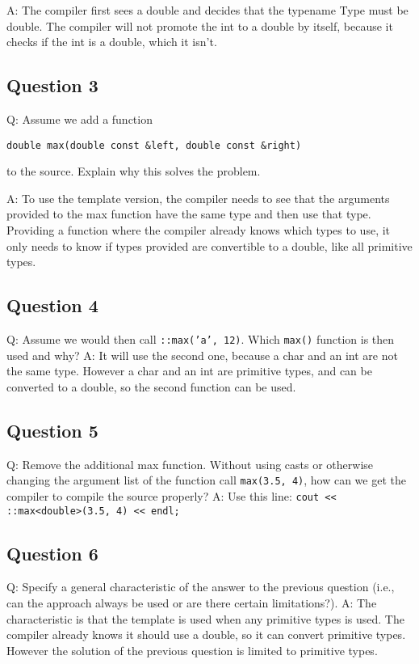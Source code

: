 \documentclass[11pt]{article}
\begin{document}
A: The compiler first sees a double and decides that the typename Type must be double.
The compiler will not promote the int to a double by itself, because it checks if the int is a double, which it isn't.

\subsection*{Question 3}
Q: Assume we add a function
\begin{lstlisting}
double max(double const &left, double const &right)
\end{lstlisting}
to the source. Explain why this solves the problem.

A: To use the template version, the compiler needs to see that the arguments provided to the max function have the same type and then use that type. Providing a function where the compiler already knows which types to use, it only needs to know if types provided are convertible to a double, like all primitive types.

\subsection*{Question 4}
Q: Assume we would then call \texttt{::max('a', 12)}. Which \texttt{max()} function is then used and why?
A: It will use the second one, because a char and an int are not the same type. However a char and an int are primitive types, and can be converted to a double, so the second function can be used.

\subsection*{Question 5}
Q: Remove the additional max function. Without using casts or otherwise changing the argument list of the function call \texttt{max(3.5, 4)}, how can we get the compiler to compile the source properly?
A: Use this line: \texttt{cout << ::max<double>(3.5, 4) << endl;}



\subsection*{Question 6}
Q: Specify a general characteristic of the answer to the previous question (i.e., can the approach always be used or are there certain limitations?).
A: The characteristic is that the template is used when any primitive types is used. The compiler already knows it should use a double, so it can convert primitive types. However the solution of the previous question is limited to primitive types.
\end{document}
